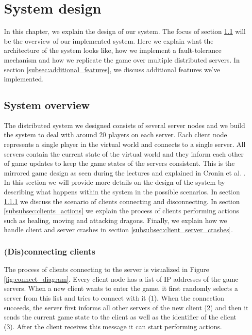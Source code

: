 \section{System design}
In this chapter, we explain the design of our system. The focus of section \ref{subsec:system_overview} will be the overview of our implemented system.
Here we explain what the architecture of the system looks like, how we implement a fault-tolerance mechanism and how we replicate the game over multiple distributed servers. 
In section \ref{subsec:additional_features}, we discuss additional features we've implemented.

\subsection{System overview}
\label{subsec:system_overview}
The distributed system we designed consists of several server nodes and we build the system to deal with around 20 players on each server. 
Each client node represents a single player in the virtual world and connects to a single server.
All servers contain the current state of the virtual world and they inform each other of game updates to keep the game states of the servers consistent. 
This is the mirrored game design as seen during the lectures and explained in Cronin et al. \cite{cronin2002efficient}. 
In this section we will provide more details on the design of the system by describing what happens within the system in the possible scenarios. 
In section \ref{subsubsec:disconnecting_clients} we discuss the scenario of clients connecting and disconnecting. 
In section \ref{subsubsec:clients_actions} we explain the process of clients performing actions such as healing, moving and attacking dragons. 
Finally, we explain how we handle client and server crashes in section \ref{subsubsec:client_server_crashes}.

\subsubsection{(Dis)connecting clients}
\label{subsubsec:disconnecting_clients}
The process of clients connecting to the server is visualized in Figure \ref{fig:connect_diagram}. 
Every client node has a list of IP addresses of the game servers. When a new client wants to enter the game, it first randomly selects a server from this list and tries to connect with it (1). 
When the connection succeeds, the server first informs all other servers of the new client (2) and then it sends the current game state to the client as well as the identifier of the client (3). 
After the client receives this message it can start performing actions.

